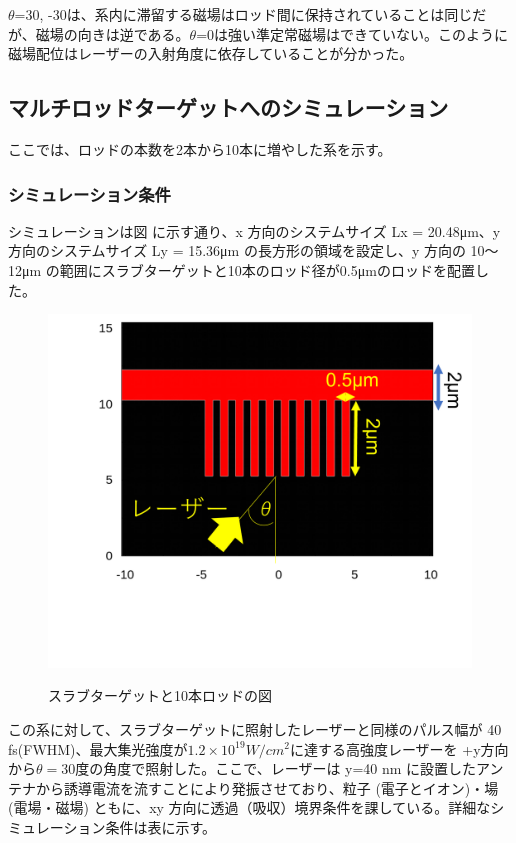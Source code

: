 \documentclass[a4paper,11pt,titlepage]{jarticle}
\numberwithin{equation}{section} %
\begin{document}
  $\theta$=30, -30は、系内に滞留する磁場はロッド間に保持されていることは同じだが、磁場の向きは逆である。$\theta$=0は強い準定常磁場はできていない。このように磁場配位はレーザーの入射角度に依存していることが分かった。

\subsection{マルチロッドターゲットへのシミュレーション}
ここでは、ロッドの本数を2本から10本に増やした系を示す。

\subsubsection{シミュレーション条件}
シミュレーションは図 に示す通り、x 方向のシステムサイズ Lx = 20.48μm、y 方向のシステムサイズ Ly = 15.36μm の長方形の領域を設定し、y 方向の 10～12μm の範囲にスラブターゲットと10本のロッド径が0.5μmのロッドを配置した。

\begin{figure}[H]
  \begin{center}
    \includegraphics[scale=0.4]{./image/4-9-10rod.png}
    \label{fig:4-8}
    \caption{スラブターゲットと10本ロッドの図}
  \end{center}
\end{figure}

この系に対して、スラブターゲットに照射したレーザーと同様のパルス幅が 40 fs(FWHM)、最大集光強度が$1.2×10^{19}W/cm^2$に達する高強度レーザーを +y方向から$\theta=$30度の角度で照射した。ここで、レーザーは y=40 nm に設置したアンテナから誘導電流を流すことにより発振させており、粒子 (電子とイオン)・場 (電場・磁場) ともに、xy 方向に透過（吸収）境界条件を課している。詳細なシミュレーション条件は表に示す。
\end{document}
